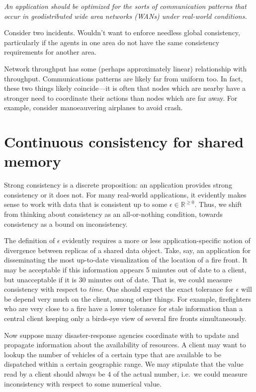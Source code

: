 \documentclass[]             %
{NASA}                       %
\theoremstyle{definition}
\begin{document}
\emph{An application should be optimized for the sorts of
communication patterns that occur in geodistributed wide area networks
(WANs) under real-world conditions.}

Consider two incidents. Wouldn't want to enforce needless global
consistency, particularly if the agents in one area do not have the same
consistency requirements for another area.

Network throughput has some (perhaps approximately linear) relationship
with throughput. Communications patterns are likely far from uniform
too. In fact, these two things likely coincide---it is often that nodes
which are nearby have a stronger need to coordinate their actions than
nodes which are far away. For example, consider manoeauvering airplanes
to avoid crash.

\hypertarget{continuous-consistency-for-shared-memory}{%
\section{Continuous consistency for shared
memory}\label{continuous-consistency-for-shared-memory}}

\label{sec:contcons}

Strong consistency is a discrete proposition: an application provides
strong consistency or it does not. For many real-world applications, it
evidently makes sense to work with data that is consistent up to some
\(\epsilon \in \mathbb{R}^{\geq 0}\). Thus, we shift from thinking about
consistency as an all-or-nothing condition, towards consistency as a
bound on inconsistency.

The definition of \(\epsilon\) evidently requires a more or less
application-specific notion of divergence between replicas of a shared
data object. Take, say, an application for disseminating the most
up-to-date visualization of the location of a fire front. It may be
acceptable if this information appears 5 minutes out of date to a
client, but unacceptable if it is 30 minutes out of date. That is, we
could measure consistency with respect to \emph{time}. One should expect
the exact tolerance for \(\epsilon\) will be depend very much on the
client, among other things. For example, firefighters who are very close
to a fire have a lower tolerance for stale information than a central
client keeping only a birds-eye view of several fire fronts
simultaneously.

Now suppose many disaster-response agencies coordinate with to update
and propagate information about the availability of resources. A client
may want to lookup the number of vehicles of a certain type that are
available to be dispatched within a certain geographic range. We may
stipulate that the value read by a client should always be \(4\) of the
actual number, i.e.~we could measure inconsistency with respect to some
numerical value.
\end{document}
